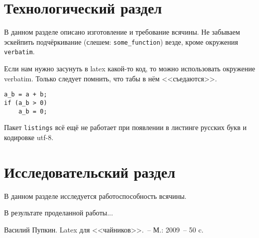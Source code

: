\documentclass[utf8]{G7-32} %
\newcommand{\code}[1]{\texttt{#1}}
\begin{document}
\chapter{Технологический раздел}

В данном разделе описано изготовление и требование всячины. Не забываем эскейпить подчёркивание (слешем: \code{some\_function}) везде, кроме окружения \texttt{verbatim}.

Если нам нужно засунуть в latex какой-то код, то можно использовать окружение verbatim. Только следует помнить, что табы в нём <<съедаются>>.
\begin{verbatim}
a_b = a + b;
if (a_b > 0)
    a_b = 0;
\end{verbatim}

Пакет \texttt{listings} всё ещё не работает при появлении в листинге русских букв и кодировке utf-8.

\chapter{Исследовательский раздел}

В данном разделе исследуется работоспособность всячины.

\backmatter %

\Conclusion %

В результате проделанной работы...
%
\begin{thebibliography}{99}
 Василий Пупкин. Latex для <<чайников>>.~-- М.: 2009~-- 50 c.
\end{thebibliography}
\end{document}
